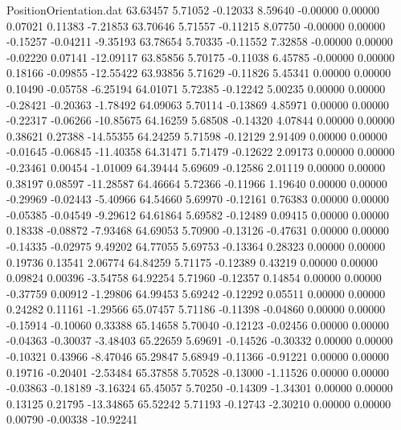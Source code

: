 \begin{filecontents}{PositionOrientation.dat}
  63.63457    5.71052   -0.12033     8.59640   -0.00000    0.00000    0.07021    0.11383   -7.21853
  63.70646    5.71557   -0.11215     8.07750   -0.00000    0.00000   -0.15257   -0.04211   -9.35193
  63.78654    5.70335   -0.11552     7.32858   -0.00000    0.00000   -0.02220    0.07141  -12.09117
  63.85856    5.70175   -0.11038     6.45785   -0.00000    0.00000    0.18166   -0.09855  -12.55422
  63.93856    5.71629   -0.11826     5.45341    0.00000    0.00000    0.10490   -0.05758   -6.25194
  64.01071    5.72385   -0.12242     5.00235    0.00000    0.00000   -0.28421   -0.20363   -1.78492
  64.09063    5.70114   -0.13869     4.85971    0.00000    0.00000   -0.22317   -0.06266  -10.85675
  64.16259    5.68508   -0.14320     4.07844    0.00000    0.00000    0.38621    0.27388  -14.55355
  64.24259    5.71598   -0.12129     2.91409    0.00000    0.00000   -0.01645   -0.06845  -11.40358
  64.31471    5.71479   -0.12622     2.09173    0.00000    0.00000   -0.23461    0.00454   -1.01009
  64.39444    5.69609   -0.12586     2.01119    0.00000    0.00000    0.38197    0.08597  -11.28587
  64.46664    5.72366   -0.11966     1.19640    0.00000    0.00000   -0.29969   -0.02443   -5.40966
  64.54660    5.69970   -0.12161     0.76383    0.00000    0.00000   -0.05385   -0.04549   -9.29612
  64.61864    5.69582   -0.12489     0.09415    0.00000    0.00000    0.18338   -0.08872   -7.93468
  64.69053    5.70900   -0.13126    -0.47631    0.00000    0.00000   -0.14335   -0.02975    9.49202
  64.77055    5.69753   -0.13364     0.28323    0.00000    0.00000    0.19736    0.13541    2.06774
  64.84259    5.71175   -0.12389     0.43219    0.00000    0.00000    0.09824    0.00396   -3.54758
  64.92254    5.71960   -0.12357     0.14854    0.00000    0.00000   -0.37759    0.00912   -1.29806
  64.99453    5.69242   -0.12292     0.05511    0.00000    0.00000    0.24282    0.11161   -1.29566
  65.07457    5.71186   -0.11398    -0.04860    0.00000    0.00000   -0.15914   -0.10060    0.33388
  65.14658    5.70040   -0.12123    -0.02456    0.00000    0.00000   -0.04363   -0.30037   -3.48403
  65.22659    5.69691   -0.14526    -0.30332    0.00000    0.00000   -0.10321    0.43966   -8.47046
  65.29847    5.68949   -0.11366    -0.91221    0.00000    0.00000    0.19716   -0.20401   -2.53484
  65.37858    5.70528   -0.13000    -1.11526    0.00000    0.00000   -0.03863   -0.18189   -3.16324
  65.45057    5.70250   -0.14309    -1.34301    0.00000    0.00000    0.13125    0.21795  -13.34865
  65.52242    5.71193   -0.12743    -2.30210    0.00000    0.00000    0.00790   -0.00338  -10.92241

\end{filecontents}
